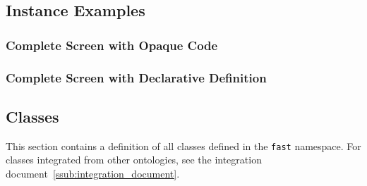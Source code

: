 \documentclass{fast_latex}
\begin{document}
\subsection{Instance Examples} %
\label{sub:instance_examples}

\subsubsection{Complete Screen with Opaque Code} %
\label{ssub:complete_screen}

\singlespacing
{}

\doublespacing


\subsubsection{Complete Screen with Declarative Definition} %
\label{ssub:complete_screen_with_declarative_definition}

\singlespacing
{}

\doublespacing



\subsection{Classes} %
\label{sub:classes}

This section contains a definition of all classes defined in the \texttt{fast} namespace. For classes integrated from other ontologies, see the integration document~\ref{ssub:integration_document}.

\singlespacing
\begin{small}

\end{small}
\doublespacing

\end{document}
